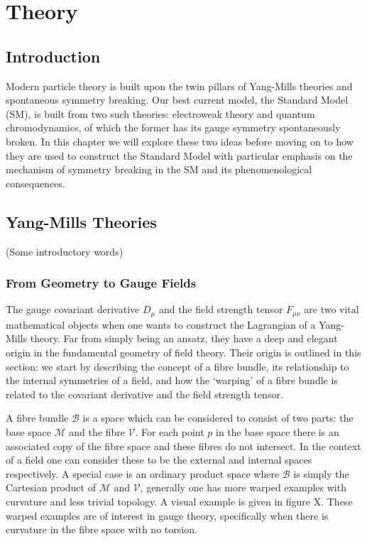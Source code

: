 \chapter{Theory}
\label{chap:theory}


\section{Introduction}
Modern particle theory is built upon the twin pillars of Yang-Mills theories and spontaneous symmetry breaking. 
Our best current model, the Standard Model (SM), is built from two such theories: electroweak theory and quantum chromodynamics, of which the former has its gauge symmetry spontaneously broken. 
In this chapter we will explore these two ideas before moving on to how they are used to construct the Standard Model with particular emphasis on the mechanism of symmetry breaking in the SM and its phenomenological consequences. 







\section{Yang-Mills Theories}
(Some introductory words)

\subsection{From Geometry to Gauge Fields}
The gauge covariant derivative $D_{\mu}$ and the field strength tensor $F_{\mu\nu}$ are two vital mathematical objects when one wants to construct the Lagrangian of a Yang-Mills theory.
Far from simply being an ansatz, they have a deep and elegant origin in the fundamental geometry of field theory. 
Their origin is outlined in this section: we start by describing the concept of a fibre bundle, its relationship to the internal symmetries of a field, and how the `warping' of a fibre bundle is related to the covariant derivative and the field strength tensor.


A fibre bundle $\mathcal{B}$ is a space which can be considered to consist of two parts: the base space $\mathcal{M}$ and the fibre $\mathcal{V}$. For each point $p$ in the base space there is an associated copy of the fibre space and these fibres do not intersect. 
In the context of a field one can consider these to be the external and internal spaces respectively. A special case is an ordinary product space where $\mathcal{B}$ is simply the Cartesian product of $\mathcal{M}$ and $\mathcal{V}$, generally one has more warped examples with curvature and less trivial topology. A visual example is given in figure X.
These warped examples are of interest in gauge theory, specifically when there is curvature in the fibre space with no torsion.


